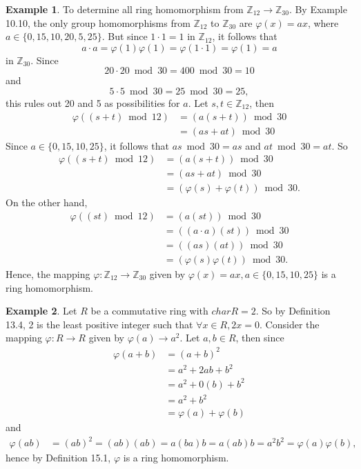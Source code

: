 \documentclass{article}
\theoremstyle{definition}
\newtheorem{example}{Example}[section]
\begin{document}
\begin{example}
    To determine all ring homomorphism from $\mathbb{Z}_{12}\to\mathbb{Z}_{30}$. By Example 10.10, the only group homomorphisms from $\mathbb{Z}_{12}$ to $\mathbb{Z}_{30}$ are $\varphi(x)=ax$, where $a\in\{0,15,10,20,5,25\}$. But since $1\cdot1=1$ in $\mathbb{Z}_{12}$, it follows that
    \begin{equation*}
        a\cdot a=\varphi(1)\varphi(1)=\varphi(1\cdot1)=\varphi(1)=a
    \end{equation*}
    in $\mathbb{Z}_{30}$. Since
    \begin{equation*}
        20\cdot20\bmod30=400\bmod30=10
    \end{equation*}
    and
    \begin{equation*}
        5\cdot5\bmod30=25\bmod30=25,
    \end{equation*}
    this rules out 20 and 5 as possibilities for $a$. Let $s,t\in\mathbb{Z}_{12}$, then
    \begin{align*}
        \varphi((s+t)\bmod12)&=(a(s+t))\bmod30\\
        &=(as+at)\bmod30
    \end{align*}
    Since $a\in\{0,15,10,25\}$, it follows that $as\bmod30=as$ and $ at\bmod30=at$. So
    \begin{align*}
        \varphi((s+t)\bmod12)&=(a(s+t))\bmod30\\
        &=(as+at)\bmod30\\
        &=(\varphi(s)+\varphi(t))\bmod30.
    \end{align*}
    On the other hand,
    \begin{align*}
        \varphi((st)\bmod12)&=(a(st))\bmod30\\
        &=((a\cdot a)(st))\bmod30\\
        &=((as)(at))\bmod30\\
        &=(\varphi(s)\varphi(t))\bmod30.
    \end{align*}
    Hence, the mapping $\varphi:\mathbb{Z}_{12}\to\mathbb{Z}_{30}$ given by $\varphi(x)=ax,a\in\{0,15,10,25\}$ is a ring homomorphism.
\end{example}

\begin{example}
    Let $R$ be a commutative ring with $char R=2$. So by Definition 13.4, 2 is the least positive integer such that $\forall x \in R, 2x=0$. Consider the mapping $\varphi:R\to R$ given by $\varphi(a)\to a^2$. Let $a,b \in R$, then since 
    \begin{align*}
        \varphi(a+b)&=(a+b)^2\\
        &=a^2+2ab+b^2\\
        &=a^2+0(b)+b^2\\
        &=a^2+b^2\\
        &=\varphi(a)+\varphi(b)
    \end{align*}
    and
    \begin{align*}
        \varphi(ab)&=(ab)^2=(ab)(ab)=a(ba)b=a(ab)b=a^2b^2=\varphi(a)\varphi(b),
    \end{align*}
    hence by Definition 15.1, $\varphi$ is a ring homomorphism.
\end{example}
\end{document}
